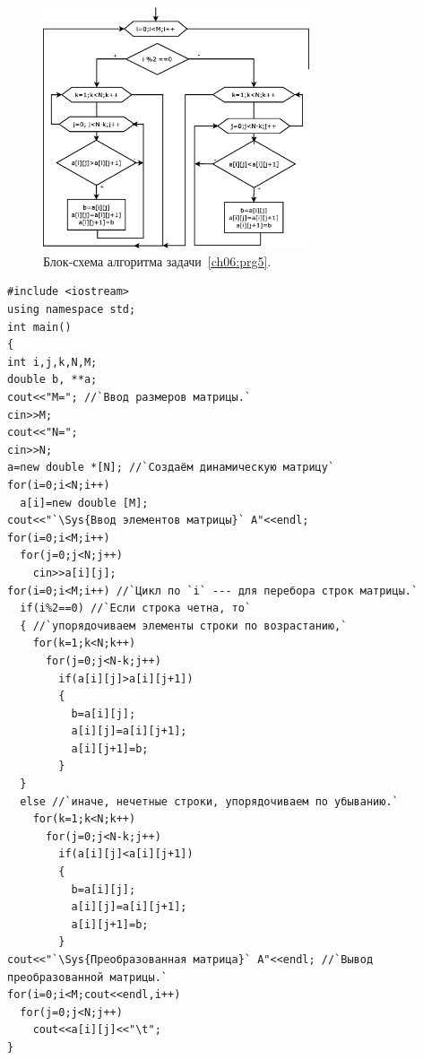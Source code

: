 \begin{figure}[htb]
\begin{center}
\includegraphics[width=0.7\textwidth]{img/ris_6_10}
\caption{Блок-схема алгоритма задачи~\ref{ch06:prg5}.}
\label{ch06:refDrawing9}
\end{center}
\end{figure}

\begin{lstlisting}
#include <iostream>
using namespace std;
int main()
{
int i,j,k,N,M;
double b, **a; 
cout<<"M="; //`Ввод размеров матрицы.`
cin>>M;
cout<<"N=";
cin>>N;
a=new double *[N]; //`Создаём динамическую матрицу`
for(i=0;i<N;i++)
  a[i]=new double [M];
cout<<"`\Sys{Ввод элементов матрицы}` A"<<endl;
for(i=0;i<M;i++)
  for(j=0;j<N;j++)
    cin>>a[i][j];
for(i=0;i<M;i++) //`Цикл по `i` --- для перебора строк матрицы.`
  if(i%2==0) //`Если строка четна, то`
  { //`упорядочиваем элементы строки по возрастанию,`
    for(k=1;k<N;k++)
      for(j=0;j<N-k;j++)
        if(a[i][j]>a[i][j+1])
        {
          b=a[i][j];
          a[i][j]=a[i][j+1];
          a[i][j+1]=b;
        }
  }
  else //`иначе, нечетные строки, упорядочиваем по убыванию.`
    for(k=1;k<N;k++)
      for(j=0;j<N-k;j++)
        if(a[i][j]<a[i][j+1])
        {
          b=a[i][j];
          a[i][j]=a[i][j+1];
          a[i][j+1]=b;
        }
cout<<"`\Sys{Преобразованная матрица}` A"<<endl; //`Вывод преобразованной матрицы.`
for(i=0;i<M;cout<<endl,i++)
  for(j=0;j<N;j++)
    cout<<a[i][j]<<"\t";
}
\end{lstlisting}


